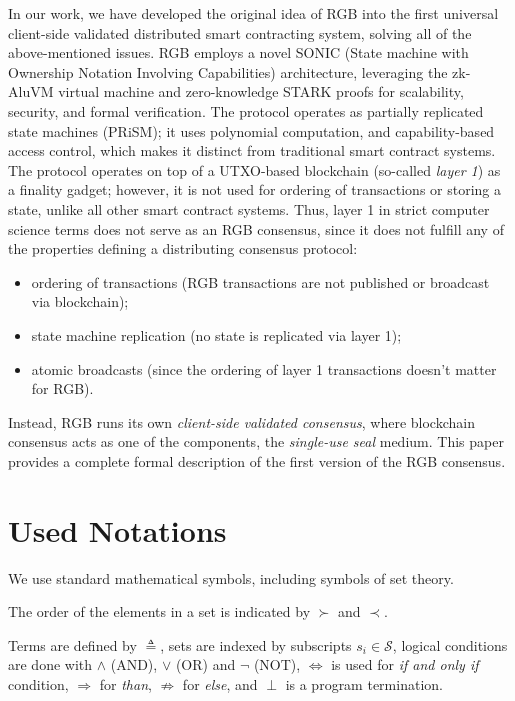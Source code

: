 \documentclass[a4paper]{article}
\begin{document}
\begin{multicols}{2}
In our work, we have developed the original idea of RGB into the first universal client-side validated
distributed smart contracting system, solving all of the above-mentioned issues.
RGB employs a novel SONIC (State machine with Ownership Notation Involving Capabilities) architecture,
leveraging the zk-AluVM virtual machine and zero-knowledge STARK proofs
for scalability, security, and formal verification.
The protocol operates as partially replicated state machines (PRiSM);
it uses polynomial computation, and capability-based access control,
which makes it distinct from traditional smart contract systems.
The protocol operates on top of a UTXO-based blockchain (so-called \emph{layer 1})
as a finality gadget; however, it is not used for ordering of transactions or storing a state,
unlike all other smart contract systems.
Thus, layer 1 in strict computer science terms does not serve as an RGB consensus,
since it does not fulfill any of the properties defining a distributing consensus protocol:

\begin{itemize}
    \item ordering of transactions (RGB transactions are not published or broadcast via blockchain);
    \item state machine replication (no state is replicated via layer 1);
    \item atomic broadcasts (since the ordering of layer 1 transactions doesn't matter for RGB).
\end{itemize}

Instead, RGB runs its own \emph{client-side validated consensus}, where blockchain consensus
acts as one of the components, the \emph{single-use seal} medium.
This paper provides a complete formal description of the first version of the RGB consensus.

\section{Used Notations}

We use standard mathematical symbols, including symbols of set theory.

The order of the elements in a set is indicated by $\succ$ and $\prec$.

Terms are defined by $\triangleq$, sets are indexed by subscripts $s_i \in \mathcal{S}$,
logical conditions are done with $\land$ (AND), $\lor$ (OR) and $\lnot$ (NOT),
$\Longleftrightarrow$ is used for \emph{if and only if} condition,
$\Rightarrow$ for \emph{than}, $\nRightarrow$ for \emph{else}, and $\perp$ is a program termination.


\end{multicols}
\end{document}
